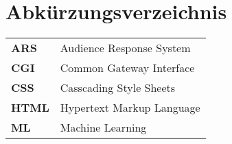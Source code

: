 
\chapter*{Abkürzungsverzeichnis}
\begin{longtable}{ll}
\textbf{ARS}  & Audience Response System  \\
\textbf{CGI}  & Common Gateway Interface  \\
\textbf{CSS}  & Casscading Style Sheets   \\
\textbf{HTML} & Hypertext Markup Language \\
\textbf{ML}   & Machine Learning         
\end{longtable}

\cleardoublepage